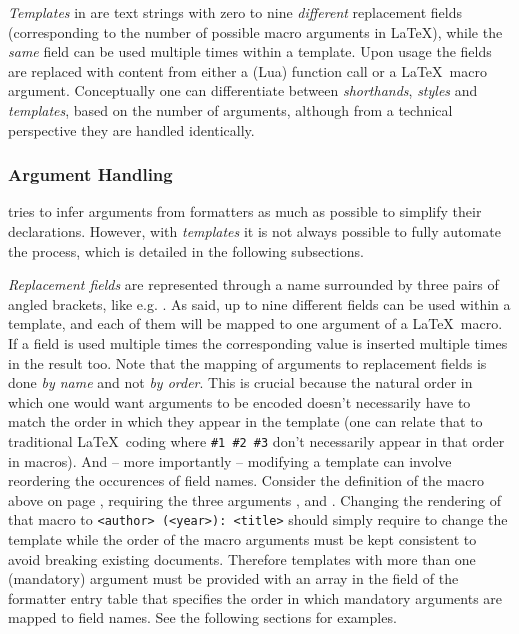 \documentclass{scrartcl}
\begin{document}
\emph{Templates} in  are text strings with zero to nine
\emph{different} replacement fields (corresponding to the number of possible
macro arguments in \LaTeX), while the \emph{same} field can be used multiple
times within a template.  Upon usage the fields are replaced with content from
either a (Lua) function call or a \LaTeX\ macro argument.  Conceptually one can
differentiate between \emph{shorthands}, \emph{styles} and \emph{templates},
based on the number of arguments, although from a technical perspective they are
handled identically.


\subsubsection{Argument Handling}
\label{sec:templates-argument-handling}

 tries to infer arguments from formatters as much as
possible to simplify their declarations.  However, with \emph{templates} it is
not always possible to fully automate the process, which is detailed in the
following subsections.

\emph{Replacement fields} are represented through a name surrounded by three
pairs of angled brackets, like e.g. .  As said, up to nine
different fields can be used within a template, and each of them will be mapped
to one argument of a \LaTeX\ macro.  If a field is used multiple times the
corresponding value is inserted multiple times in the result too. Note that the
mapping of arguments to replacement fields is done \emph{by name} and not
\emph{by order}.  This is crucial because the natural order in which one would
want arguments to be encoded doesn't necessarily have to match the order in
which they appear in the template (one can relate that to traditional \LaTeX\
coding where \texttt{\#1 \#2 \#3} don't necessarily appear in that order in
macros). And -- more importantly -- modifying a template can involve reordering
the occurences of field names. Consider the definition of the \cmd{bookShort}
macro above on page \pageref{fig:bookShort}, requiring the three arguments
\luavar{author}, \luavar{title} and \luavar{year}.  Changing the rendering of
that macro to \texttt{<author> (<year>): <title>} should simply require to
change the template while the order of the macro arguments must be kept
consistent to avoid breaking existing documents.  Therefore templates with more
than one (mandatory) argument must be provided with an array in the
\luavar{args} field of the formatter entry table that specifies the order in
which mandatory arguments are mapped to field names.  See the following sections
for examples.
\end{document}
